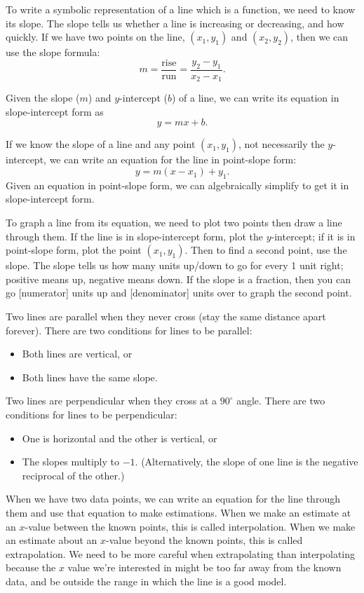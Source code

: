 \documentclass{article}
\begin{document}
To write a symbolic representation of a line which is a function, we need to know its slope. The slope tells us whether a line is increasing or decreasing, and how quickly. If we have two points on the line, $(x_1,y_1)$ and $(x_2,y_2)$, then we can use the slope formula: \[m=\frac{\text{rise}}{\text{run}}=\frac{y_2-y_1}{x_2-x_1}.\]

Given the slope ($m$) and $y$-intercept ($b$) of a line, we can write its equation in slope-intercept form as \[y=mx+b.\]

If we know the slope of a line and any point $(x_1,y_1)$, not necessarily the $y$-intercept, we can write an equation for the line in point-slope form: \[y=m(x-x_1)+y_1.\]
Given an equation in point-slope form, we can algebraically simplify to get it in slope-intercept form.

To graph a line from its equation, we need to plot two points then draw a line through them. If the line is in slope-intercept form, plot the $y$-intercept; if it is in point-slope form, plot the point $(x_1,y_1)$. Then to find a second point, use the slope. The slope tells us how many units up/down to go for every 1 unit right; positive means up, negative means down. If the slope is a fraction, then you can go [numerator] units up and [denominator] units over to graph the second point.

Two lines are parallel when they never cross (stay the same distance apart forever). There are two conditions for lines to be parallel:
\begin{itemize}
    \item Both lines are vertical, or
    \item Both lines have the same slope.
\end{itemize}

Two lines are perpendicular when they cross at a $90^\circ$ angle. There are two conditions for lines to be perpendicular:
\begin{itemize}
    \item One is horizontal and the other is vertical, or
    \item The slopes multiply to $-1$. (Alternatively, the slope of one line is the negative reciprocal of the other.)
\end{itemize}

When we have two data points, we can write an equation for the line through them and use that equation to make estimations. When we make an estimate at an $x$-value between the known points, this is called interpolation. When we make an estimate about an $x$-value beyond the known points, this is called extrapolation. We need to be more careful when extrapolating than interpolating because the $x$ value we're interested in might be too far away from the known data, and be outside the range in which the line is a good model.
\end{document}
